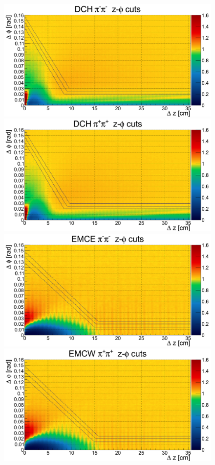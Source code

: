 \documentclass[11pt,a4paper]{article}
\numberwithin{equation}{subsection}
\numberwithin{figure}{section}
\begin{document}
\begin{figure}[H]
\centering
\includegraphics[scale=0.17]{pic/dat/kd/Corr_DCH_dzdp_mm.png}
\includegraphics[scale=0.17]{pic/dat/kd/Corr_DCH_dzdp_pp.png}\\
\includegraphics[scale=0.17]{pic/dat/kd/Corr_EMCE_dzdp_mm.png}
\includegraphics[scale=0.17]{pic/dat/kd/Corr_EMCW_dzdp_pp.png}\\

\end{figure}
\end{document}
